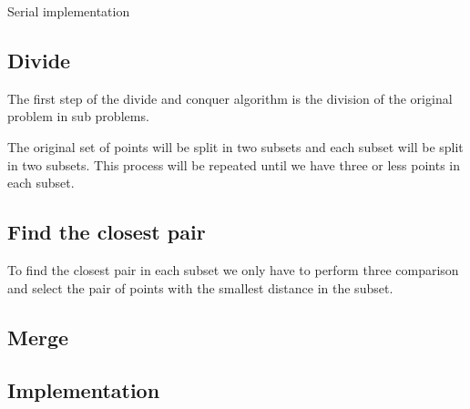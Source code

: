 Serial implementation
\subsection{Divide}
The first step of the divide and conquer algorithm is the division
of the original problem in sub problems. 

The original set of points will be split in two subsets and each
subset will be split in two subsets. This process will be repeated
until we have three or less points in each subset.
\subsection{Find the closest pair}
To find the closest pair in each subset we only have to perform
three comparison and select the pair of points with the smallest
distance in the subset.
\subsection{Merge}
\subsection{Implementation}
